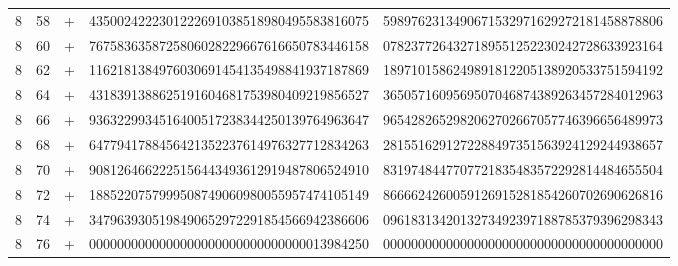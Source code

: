 \begin{longtable}{rrrll}
8 & 58 & + & 4350024222301222691038518980495583816075 & 5989762313490671532971629272181458878806 \\
8 & 60 & + & 7675836358725806028229667616650783446158 & 0782377264327189551252230242728633923164 \\
8 & 62 & + & 1162181384976030691454135498841937187869 & 1897101586249891812205138920533751594192 \\
8 & 64 & + & 4318391388625191604681753980409219856527 & 3650571609569507046874389263457284012963 \\
8 & 66 & + & 9363229934516400517238344250139764963647 & 9654282652982062702667057746396656489973 \\
8 & 68 & + & 6477941788456421352237614976327712834263 & 2815516291272288497351563924129244938657 \\
8 & 70 & + & 9081264662225156443493612919487806524910 & 8319748447707721835483572292814484655504 \\
8 & 72 & + & 1885220757999508749060980055957474105149 & 8666624260059126915281854260702690626816 \\
8 & 74 & + & 3479639305198490652972291854566942386606 & 0961831342013273492397188785379396298343 \\
8 & 76 & + & 0000000000000000000000000000000013984250 & 0000000000000000000000000000000000000000 \\
\end{longtable}
\endgroup
